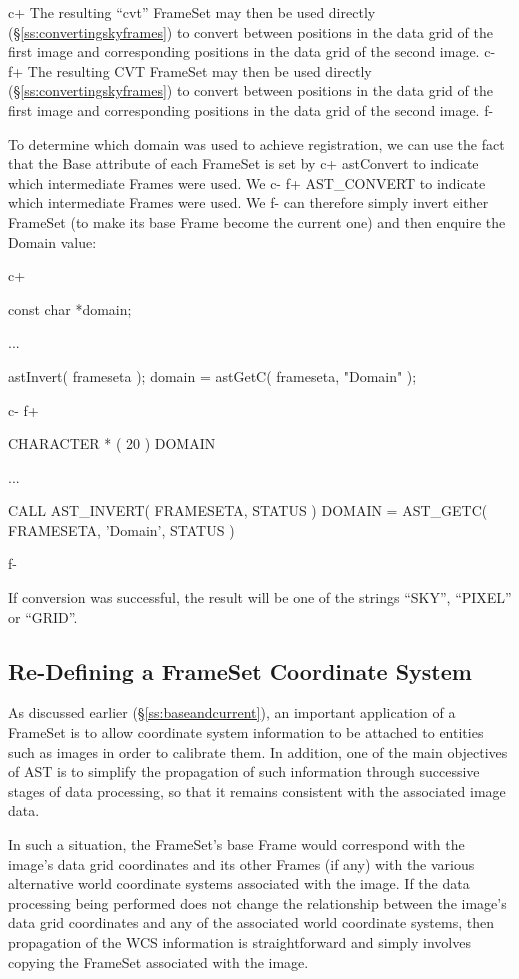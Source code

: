 \documentclass[twoside,11pt]{starlink}
\providecommand{\secref}[1]{\S\ref{#1}}
\begin{document}
{c+
The resulting ``cvt'' FrameSet may then be used directly
(\secref{ss:convertingskyframes}) to convert between positions in the
data grid of the first image and corresponding positions in the data
grid of the second image.
c-
f+
The resulting CVT FrameSet may then be used directly
(\secref{ss:convertingskyframes}) to convert between positions in the
data grid of the first image and corresponding positions in the data
grid of the second image.
f-

To determine which domain was used to achieve registration,
we can use the fact that the Base attribute of each FrameSet is set by
c+
astConvert to indicate which intermediate Frames were used. We
c-
f+
AST\_CONVERT to indicate which intermediate Frames were used. We
f-
can therefore simply invert either FrameSet (to make its base Frame
become the current one) and then enquire the Domain value:

c+
\small
\begin{terminalv}
const char *domain;

...

astInvert( frameseta );
domain = astGetC( frameseta, "Domain" );
\end{terminalv}
\normalsize
c-
f+
\small
\begin{terminalv}
      CHARACTER * ( 20 ) DOMAIN

      ...


      CALL AST_INVERT( FRAMESETA, STATUS )
      DOMAIN = AST_GETC( FRAMESETA, 'Domain', STATUS )
\end{terminalv}
\normalsize
f-

If conversion was successful, the result will be one of the strings
``SKY'', ``PIXEL'' or ``GRID''.

\subsection{\label{ss:remapframe}Re-Defining a FrameSet Coordinate System}

As discussed earlier (\secref{ss:baseandcurrent}), an important
application of a FrameSet is to allow coordinate system information to
be attached to entities such as images in order to calibrate them. In
addition, one of the main objectives of AST is to simplify the
propagation of such information through successive stages of data
processing, so that it remains consistent with the associated image
data.

In such a situation, the FrameSet's base Frame would correspond with
the image's data grid coordinates and its other Frames (if any) with
the various alternative world coordinate systems associated with the
image.  If the data processing being performed does not change the
relationship between the image's data grid coordinates and any of the
associated world coordinate systems, then propagation of the WCS
information is straightforward and simply involves copying the
FrameSet associated with the image.

}
\end{document}
